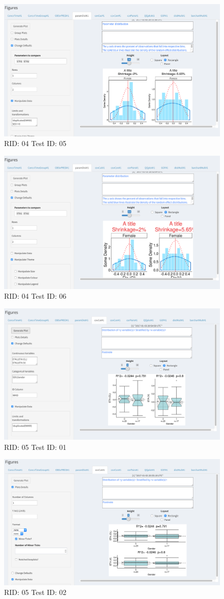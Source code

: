 \begin{figure}[H]
\includegraphics[width=.8\textwidth]{screencaps/04-05-1.png}
\caption{RID: 04 Test ID: 05}
\end{figure}
\begin{figure}[H]
\includegraphics[width=.8\textwidth]{screencaps/04-06-1.png}
\caption{RID: 04 Test ID: 06}
\end{figure}
\begin{figure}[H]
\includegraphics[width=.8\textwidth]{screencaps/05-01-1.png}
\caption{RID: 05 Test ID: 01}
\end{figure}
\begin{figure}[H]
\includegraphics[width=.8\textwidth]{screencaps/05-02-1.png}
\caption{RID: 05 Test ID: 02}
\end{figure}
